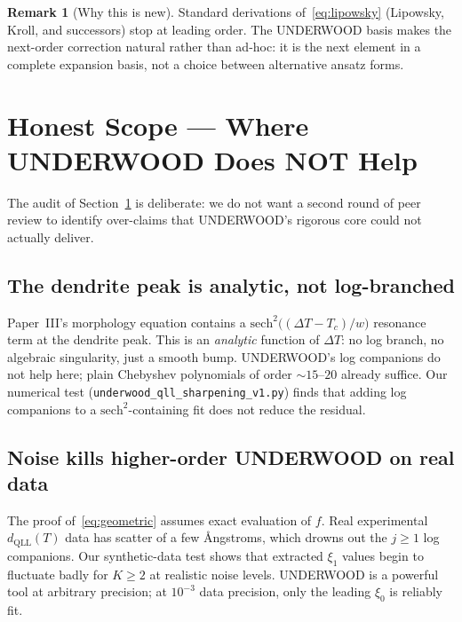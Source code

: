 \documentclass[11pt,letterpaper]{article}
\theoremstyle{plain}
\theoremstyle{definition}
\newtheorem{remark}[theorem]{Remark}
\begin{document}
\begin{remark}[Why this is new]
Standard derivations of~\eqref{eq:lipowsky} (Lipowsky, Kroll, and
successors) stop at leading order.  The UNDERWOOD basis makes the
next-order correction natural rather than ad-hoc: it is the next
element in a complete expansion basis, not a choice between alternative
ansatz forms.
\end{remark}

\section{Honest Scope — Where UNDERWOOD Does NOT Help}
\label{sec:scope}

The audit of Section~\ref{sec:scope} is deliberate: we do not want
a second round of peer review to identify over-claims that
UNDERWOOD's rigorous core could not actually deliver.

\subsection*{The dendrite peak is analytic, not log-branched}

Paper~III's morphology equation contains a
$\mathrm{sech}^2\bigl((\Delta T - T_c)/w\bigr)$ resonance term at
the dendrite peak.  This is an \emph{analytic} function of
$\Delta T$: no log branch, no algebraic singularity, just a smooth
bump.  UNDERWOOD's log companions do not help here; plain
Chebyshev polynomials of order $\sim 15$--$20$ already suffice.
Our numerical test (\texttt{underwood\_qll\_sharpening\_v1.py})
finds that adding log companions to a $\mathrm{sech}^2$-containing
fit does not reduce the residual.

\subsection*{Noise kills higher-order UNDERWOOD on real data}

The proof of~\eqref{eq:geometric} assumes exact evaluation of $f$.
Real experimental $d_{\text{QLL}}(T)$ data has scatter of a few
\AA ngstroms, which drowns out the $j \ge 1$ log companions.  Our
synthetic-data test shows that extracted $\xi_1$ values begin to
fluctuate badly for $K \ge 2$ at realistic noise levels.  UNDERWOOD
is a powerful tool at arbitrary precision; at $10^{-3}$ data
precision, only the leading $\xi_0$ is reliably fit.
\end{document}
